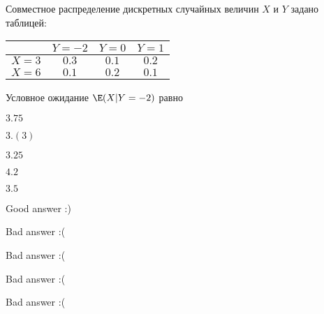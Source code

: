 
\begin{question}
Совместное распределение дискретных случайных величин \(X\) и \(Y\)
задано таблицей:

\begin{tabular}{cccc}
\toprule
 & $Y=-2$ & $Y=0$ & $Y=1$ \\
\midrule
$X=3$ & $0.3$ & $0.1$ & $0.2$  \\
$X=6$ & $0.1$ & $0.2$ & $0.1$ \\
\bottomrule
\end{tabular}

Условное ожидание \(\E(X|Y=-2)\) равно
\begin{answerlist}
  \item \(3.75\)
  \item \(3.(3)\)
  \item \(3.25\)
  \item \(4.2\)
  \item \(3.5\)
\end{answerlist}
\end{question}

\begin{solution}
\begin{answerlist}
  \item Good answer :)
  \item Bad answer :(
  \item Bad answer :(
  \item Bad answer :(
  \item Bad answer :(
\end{answerlist}
\end{solution}


